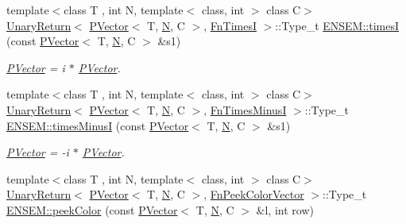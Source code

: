 \begin{DoxyCompactItemize}
\item 
{\footnotesize template$<$class T , int N, template$<$ class, int $>$ class C$>$ }\\\mbox{\hyperlink{structENSEM_1_1UnaryReturn}{Unary\+Return}}$<$ \mbox{\hyperlink{classENSEM_1_1PVector}{P\+Vector}}$<$ T, \mbox{\hyperlink{operator__name__util_8cc_a7722c8ecbb62d99aee7ce68b1752f337}{N}}, C $>$, \mbox{\hyperlink{structENSEM_1_1FnTimesI}{Fn\+TimesI}} $>$\+::Type\+\_\+t \mbox{\hyperlink{group__primvector_ga0c6f467326b48a0fafa4b42ce712d0c1}{E\+N\+S\+E\+M\+::timesI}} (const \mbox{\hyperlink{classENSEM_1_1PVector}{P\+Vector}}$<$ T, \mbox{\hyperlink{operator__name__util_8cc_a7722c8ecbb62d99aee7ce68b1752f337}{N}}, C $>$ \&s1)
\begin{DoxyCompactList}\small\item\em \mbox{\hyperlink{classENSEM_1_1PVector}{P\+Vector}} = i $\ast$ \mbox{\hyperlink{classENSEM_1_1PVector}{P\+Vector}}. \end{DoxyCompactList}\item 
{\footnotesize template$<$class T , int N, template$<$ class, int $>$ class C$>$ }\\\mbox{\hyperlink{structENSEM_1_1UnaryReturn}{Unary\+Return}}$<$ \mbox{\hyperlink{classENSEM_1_1PVector}{P\+Vector}}$<$ T, \mbox{\hyperlink{operator__name__util_8cc_a7722c8ecbb62d99aee7ce68b1752f337}{N}}, C $>$, \mbox{\hyperlink{structENSEM_1_1FnTimesMinusI}{Fn\+Times\+MinusI}} $>$\+::Type\+\_\+t \mbox{\hyperlink{group__primvector_gaa73c49a7eea92a59f41ed2ae3deeab2f}{E\+N\+S\+E\+M\+::times\+MinusI}} (const \mbox{\hyperlink{classENSEM_1_1PVector}{P\+Vector}}$<$ T, \mbox{\hyperlink{operator__name__util_8cc_a7722c8ecbb62d99aee7ce68b1752f337}{N}}, C $>$ \&s1)
\begin{DoxyCompactList}\small\item\em \mbox{\hyperlink{classENSEM_1_1PVector}{P\+Vector}} = -\/i $\ast$ \mbox{\hyperlink{classENSEM_1_1PVector}{P\+Vector}}. \end{DoxyCompactList}\item 
{\footnotesize template$<$class T , int N, template$<$ class, int $>$ class C$>$ }\\\mbox{\hyperlink{structENSEM_1_1UnaryReturn}{Unary\+Return}}$<$ \mbox{\hyperlink{classENSEM_1_1PVector}{P\+Vector}}$<$ T, \mbox{\hyperlink{operator__name__util_8cc_a7722c8ecbb62d99aee7ce68b1752f337}{N}}, C $>$, \mbox{\hyperlink{structENSEM_1_1FnPeekColorVector}{Fn\+Peek\+Color\+Vector}} $>$\+::Type\+\_\+t \mbox{\hyperlink{group__primvector_ga69a1dd204a81451dda8a8a886a17b5c9}{E\+N\+S\+E\+M\+::peek\+Color}} (const \mbox{\hyperlink{classENSEM_1_1PVector}{P\+Vector}}$<$ T, \mbox{\hyperlink{operator__name__util_8cc_a7722c8ecbb62d99aee7ce68b1752f337}{N}}, C $>$ \&l, int row)

\end{DoxyCompactItemize}
